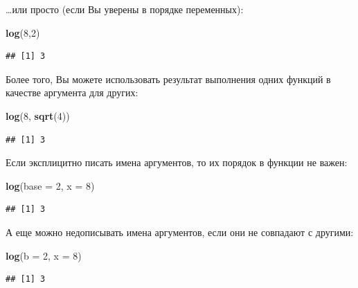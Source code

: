 \documentclass[]{book}
\newenvironment{Shaded}{\begin{snugshade}}{\end{snugshade}}
\newcommand{\KeywordTok}[1]{\textcolor[rgb]{0.13,0.29,0.53}{\textbf{#1}}}
\newcommand{\DataTypeTok}[1]{\textcolor[rgb]{0.13,0.29,0.53}{#1}}
\newcommand{\DecValTok}[1]{\textcolor[rgb]{0.00,0.00,0.81}{#1}}
\newcommand{\NormalTok}[1]{#1}
\begin{document}
\ldots{}или просто (если Вы уверены в порядке переменных):

\begin{Shaded}
\begin{Highlighting}[]
\KeywordTok{log}\NormalTok{(}\DecValTok{8}\NormalTok{,}\DecValTok{2}\NormalTok{)}
\end{Highlighting}
\end{Shaded}

\begin{verbatim}
## [1] 3
\end{verbatim}

Более того, Вы можете использовать результат выполнения одних функций в
качестве аргумента для других:

\begin{Shaded}
\begin{Highlighting}[]
\KeywordTok{log}\NormalTok{(}\DecValTok{8}\NormalTok{, }\KeywordTok{sqrt}\NormalTok{(}\DecValTok{4}\NormalTok{))}
\end{Highlighting}
\end{Shaded}

\begin{verbatim}
## [1] 3
\end{verbatim}

Если эксплицитно писать имена аргументов, то их порядок в функции не
важен:

\begin{Shaded}
\begin{Highlighting}[]
\KeywordTok{log}\NormalTok{(}\DataTypeTok{base =} \DecValTok{2}\NormalTok{, }\DataTypeTok{x =} \DecValTok{8}\NormalTok{)}
\end{Highlighting}
\end{Shaded}

\begin{verbatim}
## [1] 3
\end{verbatim}

А еще можно недописывать имена аргументов, если они не совпадают с
другими:

\begin{Shaded}
\begin{Highlighting}[]
\KeywordTok{log}\NormalTok{(}\DataTypeTok{b =} \DecValTok{2}\NormalTok{, }\DataTypeTok{x =} \DecValTok{8}\NormalTok{)}
\end{Highlighting}
\end{Shaded}

\begin{verbatim}
## [1] 3
\end{verbatim}
\end{document}
